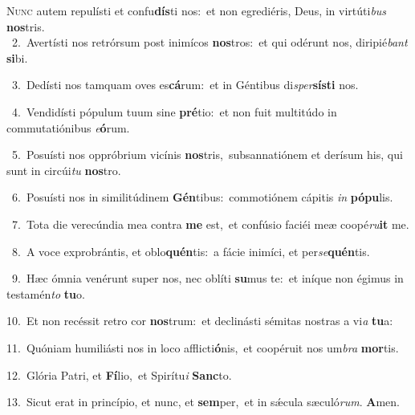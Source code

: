 \lettrine{\initial\textcolor{\initialcolor}{N}}{unc} autem repulísti et confu\-\textbf{dís}\-ti nos:~\star et non egrediéris, Deus, in virtúti\textit{bus} \textbf{nos}\-tris.\\
{\numbfont\textcolor{\numbcolor}{~2.}}~Avertísti nos retrórsum post inimícos \textbf{nos}\-tros:~\star et qui odérunt nos, diripié\textit{bant} \textbf{si}\-bi.\par
{\numbfont\textcolor{\numbcolor}{~3.}}~Dedísti nos tamquam oves es\-\textbf{cá}\-rum:~\star et in Géntibus di\-\textit{sper}\-\textbf{sís}\textbf{ti} nos.\par
{\numbfont\textcolor{\numbcolor}{~4.}}~Vendidísti pópulum tuum sine \textbf{pré}\-tio:~\star et non fuit multitúdo in commutatiónibus \textit{e}\-\textbf{ó}rum.\par
{\numbfont\textcolor{\numbcolor}{~5.}}~Posuísti nos oppróbrium vicínis \textbf{nos}\-tris,~\star subsannatiónem et derísum his, qui sunt in circúi\textit{tu} \textbf{nos}\-tro.\par
{\numbfont\textcolor{\numbcolor}{~6.}}~Posuísti nos in similitúdinem \textbf{Gén}\-tibus:~\star commotiónem cápitis \textit{in} \textbf{pó}\-\textbf{pu}lis.\par
{\numbfont\textcolor{\numbcolor}{~7.}}~Tota die verecúndia mea contra \textbf{me} est,~\star et confúsio faciéi meæ coopé\-\textit{ru}\-\textbf{it} me.\par
{\numbfont\textcolor{\numbcolor}{~8.}}~A voce exprobrántis, et oblo\-\textbf{quén}\-tis:~\star a fácie inimíci, et per\-\textit{se}\-\textbf{quén}tis.\par
{\numbfont\textcolor{\numbcolor}{~9.}}~Hæc ómnia venérunt super nos, nec oblíti \textbf{su}\-mus te:~\star et iníque non égimus in testamén\textit{to} \textbf{tu}\-o.\par
{\numbfont\textcolor{\numbcolor}{10.}}~Et non recéssit retro cor \textbf{nos}\-trum:~\star et declinásti sémitas nostras a vi\textit{a} \textbf{tu}\-a:\par
{\numbfont\textcolor{\numbcolor}{11.}}~Quóniam humiliásti nos in loco afflicti\-\textbf{ó}\-nis,~\star et coopéruit nos um\textit{bra} \textbf{mor}\-tis.\par
{\numbfont\textcolor{\numbcolor}{12.}}~Glória Patri, et \textbf{Fí}\-lio,~\star et Spirítu\textit{i} \textbf{Sanc}\-to.\par
{\numbfont\textcolor{\numbcolor}{13.}}~Sicut erat in princípio, et nunc, et \textbf{sem}\-per,~\star et in sǽcula sæculó\-\textit{rum}\-. \textbf{A}\-men.\par
